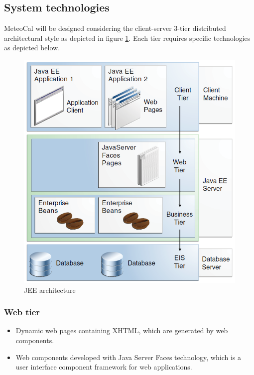 \documentclass[10pt,a4paper,titlepage]{article}
\begin{document}
\subsection{System technologies}
MeteoCal will be designed considering the client-server 3-tier distributed architectural style as depicted in figure \ref{fig:JEE_arch}. Each tier requires specific technologies as depicted below.
\begin{figure}[ph]
\centering
\includegraphics[width=\linewidth]{./images/JEE-arch}
\caption[jee arch]{JEE architecture}
\label{fig:JEE_arch}
\end{figure}


\subsubsection{Web tier}
\begin{itemize}
\item Dynamic web pages containing XHTML, which are generated by web components.
\item Web components developed with Java Server Faces technology, which is a user interface component framework for web applications.
\end{itemize}
\end{document}
